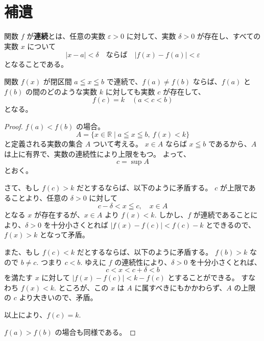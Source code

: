 \chapter{補遺}

\begin{dfn*}[関数が連続]
  関数 \(f\) が\textbf{連続}とは、任意の実数 \(\varepsilon>0\) に対して、実数 \(\delta>0\) が存在し、すべての実数 \(x\) について
  \[|x-a|<\delta \quad \text{ならば} \quad |f(x)-f(a)|<\varepsilon\]
  となることである。
\end{dfn*}

\begin{thm*}[中間値の定理]
  関数 \(f(x)\) が閉区間 \(a\leqq x\leqq b\) で連続で、\(f(a)\neq f(b)\) ならば、\(f(a)\) と \(f(b)\) の間のどのような実数 \(k\) に対しても実数 \(c\) が存在して、
  \[f(c)=k \quad (a<c<b)\]
  となる。
\end{thm*}

\begin{proof}
  \(f(a)<f(b)\) の場合。
  \[A=\{x\in\mathbb{R}\mid a\leqq x\leqq b,\ f(x)<k\}\]
  と定義される実数の集合 \(A\) ついて考える。
  \(x\in A\) ならば \(x\leqq b\) であるから、\(A\) は上に有界で、実数の連続性により上限をもつ。
  よって、
  \[c=\sup A\]
  とおく。

  さて、もし \(f(c)>k\) だとするならば、以下のように矛盾する。
  \(c\) が上限であることより、任意の \(\delta>0\) に対して
  \[c-\delta<x\leqq c,\quad x\in A\]
  となる \(x\) が存在するが、\(x\in A\) より \(f(x)<k.\)
  しかし、\(f\) が連続であることにより、\(\delta>0\) を十分小さくとれば \(|f(x)-f(c)|<f(c)-k\) とできるので、\(f(x)>k\) となって矛盾。

  また、もし \(f(c)<k\) だとするならば、以下のように矛盾する。
  \(f(b)>k\) なので \(b\neq c.\)
  つまり \(c<b.\)
  ゆえに \(f\) の連続性により、\(\delta>0\) を十分小さくとれば、
  \[c<x<c+\delta<b\]
  を満たす \(x\) に対して \(|f(x)-f(c)|<k-f(c)\) とすることができる。
  すなわち \(f(x)<k.\)
  ところが、この \(x\) は \(A\) に属すべきにもかかわらず、\(A\) の上限の \(c\) より大きいので、矛盾。

  以上により、\(f(c)=k.\)

  \(f(a)>f(b)\) の場合も同様である。
\end{proof}
